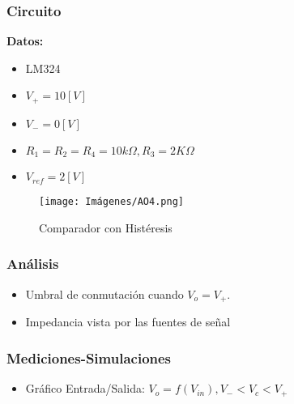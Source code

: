     \subsubsection{Circuito}
    	\begin{center}
            \textbf{Datos:}
        \end{center}
        \begin{itemize}
            \item LM324
            \item $V_{+} = 10 [V]$
            \item $V_{-} = 0 [V]$
            \item $R_1 = R_2 = R_4 = 10k\Omega, R_3 = 2K\Omega$
            \item $V_{ref} = 2 [V]$
        \end{itemize}
    	\begin{figure}[ht]
    		\centering
    		\texttt{[image: Imágenes/AO4.png]}
    		\caption{Comparador con Histéresis}
    	\end{figure}
     
     \subsubsection{Análisis}
        \begin{itemize}
            \item Umbral de conmutación cuando $V_o = V_+$.
            \item Impedancia vista por las fuentes de señal
        \end{itemize}

    \subsubsection{Mediciones-Simulaciones}
        \begin{itemize}
            \item Gráfico Entrada/Salida: $V_{o} = f(V_{in}), V_-<V_c<V_+$ 
        \end{itemize}
        
